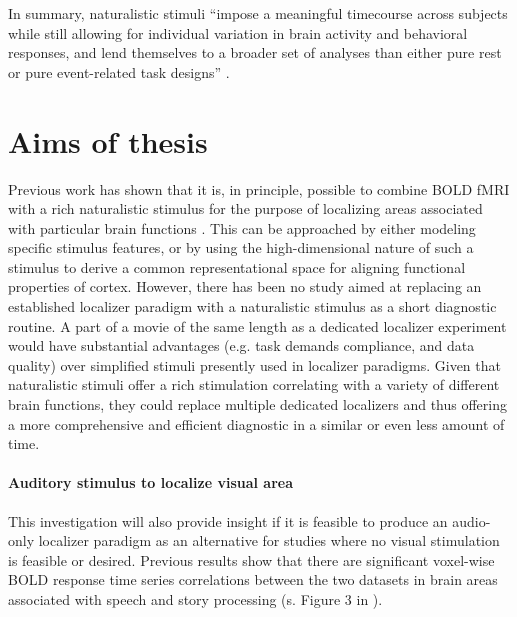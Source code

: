 \citep{chen2015reduced}


In summary, naturalistic stimuli ``impose a meaningful timecourse across
subjects while still allowing for individual variation in brain activity and
behavioral responses, and lend themselves to a broader set of analyses than
either pure rest or pure event-related task designs'' \citep{finn2017can}.


\section{Aims of thesis}

%

%
Previous work has shown that it is, in principle, possible to combine BOLD fMRI
with a rich naturalistic stimulus for the purpose of localizing areas associated
with particular brain functions \citep{bartels2004mapping}.
%
This can be approached by either modeling specific stimulus features, or by
using the high-dimensional nature of such a stimulus to derive a common
representational space for aligning functional properties of cortex.
%
However, there has been no study aimed at replacing an established localizer
paradigm with a naturalistic stimulus as a short diagnostic routine.
%
A part of a movie of the same length as a dedicated localizer experiment would
have substantial advantages (e.g. task demands compliance, and data quality)
over simplified stimuli presently used in localizer paradigms.
%
Given that naturalistic stimuli offer a rich stimulation correlating with a
variety of different brain functions, they could replace multiple dedicated
localizers and thus offering a more comprehensive and efficient diagnostic in a
similar or even less amount of time.


\paragraph{Auditory stimulus to localize visual area}
%
This investigation will also provide insight if it is feasible to produce an
audio-only localizer paradigm as an alternative for studies where no visual
stimulation is feasible or desired.
%
Previous results show that there are significant voxel-wise BOLD response time
series correlations between the two datasets in brain areas associated with
speech and story processing (s. Figure 3 in \citep{hanke2016simultaneous}).

